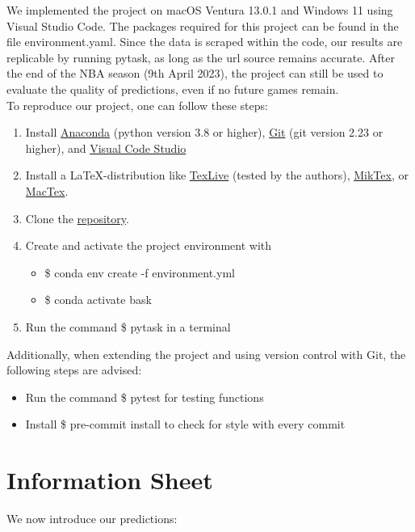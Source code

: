 \documentclass[11pt, a4paper, leqno]{article}
\begin{document}
We implemented the project on macOS Ventura 13.0.1 and Windows 11 using Visual Studio Code. The packages required for this project can be found in the file environment.yaml.
Since the data is scraped within the code, our results are replicable by running pytask, as long as the url source remains accurate.
After the end of the NBA season (9th April 2023), the project can still be used to evaluate the quality of predictions, even if no future games remain.\\
To reproduce our project, one can follow these steps:
\begin{enumerate}
    \item Install \href{https://docs.anaconda.com/anaconda/install/index.html}{Anaconda} (python version 3.8 or higher), \href{https://git-scm.com/}{Git} (git version 2.23 or higher), and \href{https://code.visualstudio.com/download}{Visual Code Studio}
    \item Install a \LaTeX-distribution like  \href{https://www.tug.org/texlive/}{TexLive} (tested by the authors), \href{https://miktex.org/}{MikTex}, or \href{https://tug.org/mactex/}{MacTex}.
    \item Clone the \href{https://github.com/NormProgr/basketball_predict}{repository}.
    \item Create and activate the project environment with
        \begin{itemize}
            \item \$ conda env create -f environment.yml
            \item \$ conda activate bask
        \end{itemize}
    \item Run the command \$ pytask in a terminal
\end{enumerate}

Additionally, when extending the project and using version control with Git, the following steps are advised:
\begin{itemize}
    \item Run the command \$ pytest for testing functions
    \item Install \$ pre-commit install to check for style with every commit
\end{itemize}

\clearpage
\section{Information Sheet}

We now introduce our predictions:
\end{document}
